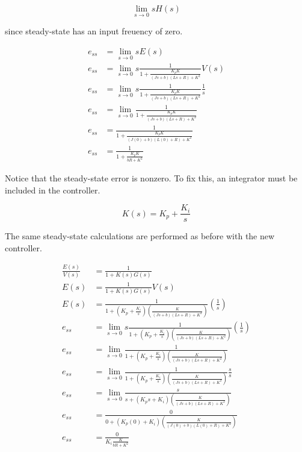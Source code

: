 \begin{equation}
  \lim_{s\to0} sH(s)
\end{equation}

since steady-state has an input freuency of zero.

\begin{align}
  e_{ss} &= \lim_{s\to0} sE(s) \nonumber \\
  e_{ss} &= \lim_{s\to0} s \frac{1}{1 + \frac{K_p K}{(Js+b)(Ls+R)+K^2}} V(s)
    \nonumber \\
  e_{ss} &= \lim_{s\to0} s \frac{1}{1 + \frac{K_p K}{(Js+b)(Ls+R)+K^2}}
    \frac{1}{s} \nonumber \\
  e_{ss} &= \lim_{s\to0} \frac{1}{1 + \frac{K_p K}{(Js+b)(Ls+R)+K^2}}
    \nonumber \\
  e_{ss} &= \frac{1}{1 + \frac{K_p K}{(J(0)+b)(L(0)+R)+K^2}} \nonumber \\
  e_{ss} &= \frac{1}{1 + \frac{K_p K}{bR+K^2}} \label{eq:ss_nonzero}
\end{align}

Notice that the \gls{steady-state error} is nonzero. To fix this, an integrator
must be included in the controller.

\begin{equation*}
  K(s) = K_p + \frac{K_i}{s}
\end{equation*}

The same steady-state calculations are performed as before with the new
controller.

\begin{align*}
  \frac{E(s)}{V(s)} &= \frac{1}{1 + K(s)G(s)} \\
  E(s) &= \frac{1}{1 + K(s)G(s)} V(s) \\
  E(s) &= \frac{1}{1 + \left(K_p + \frac{K_i}{s}\right)
    \left(\frac{K}{(Js+b)(Ls+R)+K^2}\right)} \left(\frac{1}{s}\right) \\
  e_{ss} &= \lim_{s\to0} s \frac{1}{1 + \left(K_p + \frac{K_i}{s}\right)
    \left(\frac{K}{(Js+b)(Ls+R)+K^2}\right)} \left(\frac{1}{s}\right) \\
  e_{ss} &= \lim_{s\to0} \frac{1}{1 + \left(K_p + \frac{K_i}{s}\right)
    \left(\frac{K}{(Js+b)(Ls+R)+K^2}\right)} \\
  e_{ss} &= \lim_{s\to0} \frac{1}{1 + \left(K_p + \frac{K_i}{s}\right)
    \left(\frac{K}{(Js+b)(Ls+R)+K^2}\right)} \frac{s}{s} \\
  e_{ss} &= \lim_{s\to0} \frac{s}{s + \left(K_p s + K_i\right)
    \left(\frac{K}{(Js+b)(Ls+R)+K^2}\right)} \\
  e_{ss} &= \frac{0}{0 + (K_p (0) + K_i)
    \left(\frac{K}{(J(0)+b)(L(0)+R)+K^2}\right)} \\
  e_{ss} &= \frac{0}{K_i \frac{K}{bR+K^2}}
\end{align*}

